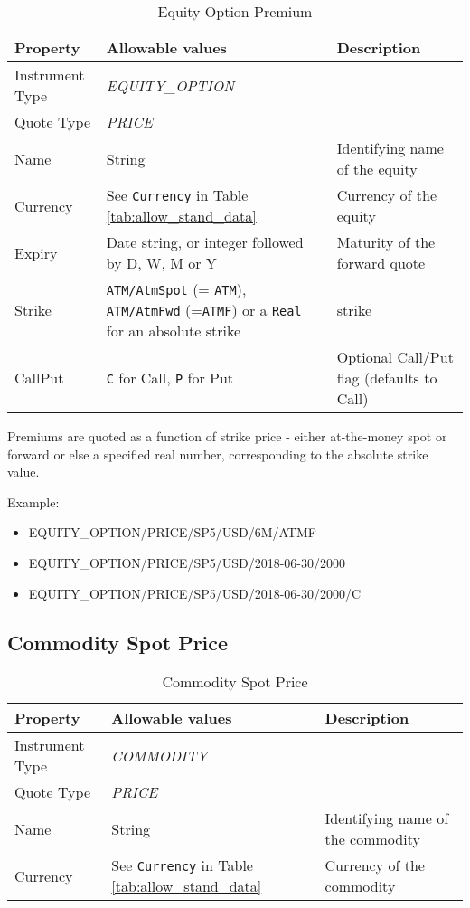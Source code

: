 \begin{table}[H]
	\centering
	\begin{tabular}{|p{3cm}|p{5.5cm}|p{5cm}|}
      \hline
      {\bf Property} & {\bf Allowable values} & {\bf Description} \\ \hline
      Instrument Type & \emph{EQUITY\_OPTION} & \\ \hline
      Quote Type & \emph{PRICE} & \\ \hline
      Name & String & Identifying name of the equity \\ \hline
      Currency & See \lstinline!Currency! in Table \ref{tab:allow_stand_data}&  Currency of the equity \\ \hline
      Expiry & Date string, or integer followed by D, W, M or Y & Maturity of the forward quote \\ \hline
      Strike & {\tt ATM/AtmSpot} (= {\tt ATM}), {\tt ATM/AtmFwd} (={\tt ATMF}) or a {\tt Real} for an absolute strike & strike \\ \hline
      CallPut & {\tt C} for Call, {\tt P} for Put & Optional Call/Put flag (defaults to Call) \\ \hline
	\end{tabular}
	\caption{Equity Option Premium}
	\label{tab:eqpremvol_quote}
\end{table}

Premiums are quoted as a function of strike price - either at-the-money spot or forward or else a specified real number,
corresponding to the absolute strike value.

\medskip
Example:
\begin{itemize}
	\item {EQUITY\_OPTION/PRICE/SP5/USD/6M/ATMF}
	\item {EQUITY\_OPTION/PRICE/SP5/USD/2018-06-30/2000}
	\item {EQUITY\_OPTION/PRICE/SP5/USD/2018-06-30/2000/C}
\end{itemize}

\subsection{Commodity Spot Price}

\begin{table}[H]
    \centering
    \begin{tabular}{|p{3cm}|p{3.5cm}|p{7cm}|}
        \hline
        {\bf Property} & {\bf Allowable values} & {\bf Description} \\ \hline
        Instrument Type & \emph{COMMODITY} & \\ \hline
        Quote Type & \emph{PRICE} & \\ \hline
        Name & String & Identifying name of the commodity \\ \hline
        Currency & See \lstinline!Currency! in Table \ref{tab:allow_stand_data}&  Currency of the commodity \\ \hline
    \end{tabular}
    \caption{Commodity Spot Price}
    \label{tab:comspot_quote}
\end{table}

